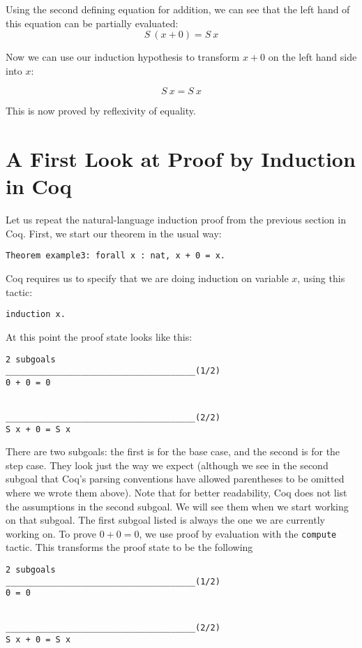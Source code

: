 \documentclass{book}[12pt]
\begin{document}
\noindent Using the second defining equation for addition, we can see
that the left hand of this equation can be partially evaluated:
\[S\ (x + 0) = S\ x\]

\noindent Now we can use our induction hypothesis to transform
$x + 0$ on the left hand side into $x$:

\[S\ x = S\ x\]

\noindent This is now proved by reflexivity of equality.

\section{A First Look at Proof by Induction in Coq}

Let us repeat the natural-language induction proof from the previous
section in Coq.  First, we start our theorem in the usual way:

\begin{verbatim}
Theorem example3: forall x : nat, x + 0 = x.
\end{verbatim}

\noindent Coq requires us to specify that we are doing induction on
variable $x$, using this tactic:

\begin{verbatim}
induction x.
\end{verbatim}

\noindent At this point the proof state looks like this:

\begin{verbatim}
2 subgoals
______________________________________(1/2)
0 + 0 = 0


______________________________________(2/2)
S x + 0 = S x
\end{verbatim}

\noindent There are two subgoals: the first is for the base case, and
the second is for the step case.  They look just the way we expect
(although we see in the second subgoal that Coq's parsing conventions
have allowed parentheses to be omitted where we wrote them above).
Note that for better readability, Coq does not list the assumptions in
the second subgoal.  We will see them when we start working on that
subgoal.  The first subgoal listed is always the one we are currently
working on.  To prove $0+0 = 0$, we use proof by evaluation with
the \texttt{compute} tactic.  This transforms the proof state to be
the following

\begin{verbatim}
2 subgoals
______________________________________(1/2)
0 = 0


______________________________________(2/2)
S x + 0 = S x
\end{verbatim}
\end{document}
